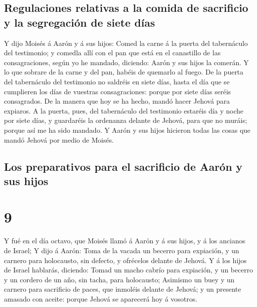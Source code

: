 \hypertarget{regulaciones-relativas-a-la-comida-de-sacrificio-y-la-segregaciuxf3n-de-siete-duxedas}{%
\subsection{Regulaciones relativas a la comida de sacrificio y la
segregación de siete
días}\label{regulaciones-relativas-a-la-comida-de-sacrificio-y-la-segregaciuxf3n-de-siete-duxedas}}

 Y dijo Moisés á Aarón y á sus hijos: Comed la carne á la
puerta del tabernáculo del testimonio; y comedla allí con el pan que
está en el canastillo de las consagraciones, según yo he mandado,
diciendo: Aarón y sus hijos la comerán.  Y lo que sobrare
de la carne y del pan, habéis de quemarlo al fuego.  De
la puerta del tabernáculo del testimonio no saldréis en siete días,
hasta el día que se cumplieren los días de vuestras consagraciones:
porque por siete días seréis consagrados.  De la manera
que hoy se ha hecho, mandó hacer Jehová para expiaros.  A
la puerta, pues, del tabernáculo del testimonio estaréis día y noche por
siete días, y guardaréis la ordenanza delante de Jehová, para que no
muráis; porque así me ha sido mandado.  Y Aarón y sus
hijos hicieron todas las cosas que mandó Jehová por medio de Moisés.

\hypertarget{los-preparativos-para-el-sacrificio-de-aaruxf3n-y-sus-hijos}{%
\subsection{Los preparativos para el sacrificio de Aarón y sus
hijos}\label{los-preparativos-para-el-sacrificio-de-aaruxf3n-y-sus-hijos}}

\hypertarget{section-8}{%
\section{9}\label{section-8}}

 Y fué en el día octavo, que Moisés llamó á Aarón y á sus
hijos, y á los ancianos de Israel;  Y dijo á Aarón: Toma
de la vacada un becerro para expiación, y un carnero para holocausto,
sin defecto, y ofrécelos delante de Jehová.  Y á los hijos
de Israel hablarás, diciendo: Tomad un macho cabrío para expiación, y un
becerro y un cordero de un año, sin tacha, para holocausto;
 Asimismo un buey y un carnero para sacrificio de paces,
que inmoléis delante de Jehová; y un presente amasado con aceite: porque
Jehová se aparecerá hoy á vosotros.

